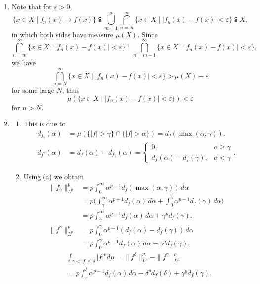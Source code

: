 \begin{enumerate}
\item[1.1.9.]
    Note that for $\varepsilon>0$,
    \[\{x \in X \mid f_{n}(x) \rightarrow f(x)\} \subseteqq 
    \bigcup_{m=1}^{\infty}\bigcap_{n=m}^{\infty}\{x \in X \mid |f_{n}(x)-f(x)|<\varepsilon\} 
    \subseteqq X,\]
    in which both sides have measure $\mu(X)$. Since 
    \[\bigcap_{n=m}^{\infty}\{x \in X \mid |f_{n}(x)-f(x)|<\varepsilon\} 
    \subseteqq \bigcap_{n=m+1}^{\infty}\{x \in X \mid |f_{n}(x)-f(x)|<\varepsilon\},\]
    we have \[\bigcap_{n=N}^{\infty}\{x \in X \mid |f_{n}(x)-f(x)|<\varepsilon\}>\mu(X)-\varepsilon\]
    for some large $N$, thus
    \[\mu(\{x \in X \mid |f_{n}(x)-f(x)|<\varepsilon\})<\varepsilon\] for $n>N$. 

\item[1.1.10.]
    \begin{enumerate}
    \item[(a)] This is due to\begin{align*}
        d_{f_\gamma}(\alpha)&=\mu(\{|f|>\gamma\}\cap\{|f|>\alpha\})=d_f(\max(\alpha,\gamma)).\\
        d_{f^\gamma}(\alpha)&=d_{f}(\alpha)-d_{f_\gamma}(\alpha)
        =\begin{cases}0,&\alpha\geq\gamma\\d_f(\alpha)-d_f(\gamma),&\alpha<\gamma\end{cases}.
    \end{align*}

    \item[(b)] Using (a) we obtain
    \begin{align*}
        \|f_\gamma\|_{L^p}^p&=p\int_0^\infty\alpha^{p-1}d_f(\max(\alpha,\gamma))\,d\alpha\\
        &=p\Big(\int_\gamma^\infty\alpha^{p-1}d_f(\alpha)\,d\alpha+\int_0^\gamma\alpha^{p-1}d_f(\gamma)\,d\alpha\Big)\\
        &=p\int_\gamma^\infty\alpha^{p-1}d_f(\alpha)\,d\alpha+\gamma^pd_f(\gamma).\\
        \|f^\gamma\|_{L^p}^p&=p\int_0^\gamma\alpha^{p-1}(d_f(\alpha)-d_f(\gamma))\,d\alpha\\
        &=p\int_0^\gamma\alpha^{p-1}d_f(\alpha)\,d\alpha-\gamma^pd_f(\gamma).
    \end{align*}
    \begin{align*}
        &\int_{\gamma<|f|\leq\delta}|f|^pd\mu=\|f^\delta\|_{L^p}^p-\|f^\gamma\|_{L^p}^p\\
        &=p\int_\gamma^\delta\alpha^{p-1}d_f(\alpha)\,d\alpha-\delta^pd_f(\delta)+\gamma^pd_f(\gamma).
    \end{align*}


\end{enumerate}
\end{enumerate}
